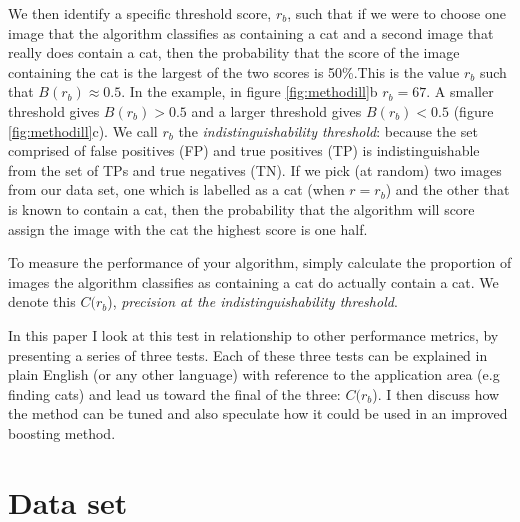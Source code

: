\documentclass[preprint,12pt]{elsarticle}
\begin{document}
We then identify a specific threshold score, $r_b$, such that if we were to choose one image that the algorithm classifies as containing a cat and a second image that really does contain a cat, then the probability that the score of the image containing the cat is the largest of the two scores is 50\%.This is the value $r_b$ such that $B(r_b) \approx 0.5$. In the example, in figure \ref{fig:methodill}b $r_b=67$. A smaller threshold gives $B(r_b) > 0.5$ and a larger threshold gives $B(r_b) < 0.5$ (figure \ref{fig:methodill}c). We call $r_b$ the {\it indistinguishability threshold}: because the set comprised of false positives (FP) and true positives (TP) is indistinguishable from the set of TPs and true negatives (TN). If we pick (at random) two images from our data set, one which is labelled as a cat (when $r=r_b$) and the other that is known to contain a cat, then the probability that the algorithm will score assign the  image with the cat the highest score is one half. 

To measure the performance of your algorithm, simply calculate the proportion of images the algorithm classifies as containing a cat do actually contain a cat. We denote this $C(r_b$), {\it precision at the indistinguishability threshold}.

In this paper I look at this test in relationship to other performance metrics, by presenting a series of three tests. Each of these three tests can be explained in plain English (or any other language) with reference to the application area (e.g finding cats) and lead us toward the final of the three: $C(r_b$). I then discuss how the method can be tuned and also speculate how it could be used in an improved boosting method. 

\section{Data set}
\end{document}
